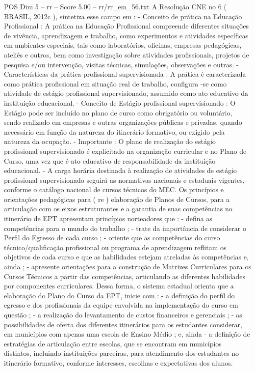 \begin{textsample}{POS Dim 5 – rr – Score 5.00 – rr/rr\_em\_56.txt}
A Resolução CNE no 6 ( BRASIL, 2012c ), sintetiza esse campo em : - Conceito de prática na Educação Profissional : A prática na Educação Profissional compreende diferentes situações de vivência, aprendizagem e trabalho, como experimentos e atividades específicas em ambientes especiais, tais como laboratórios, oficinas, empresas pedagógicas, ateliês e outros, bem como investigação sobre atividades profissionais, projetos de pesquisa e/ou intervenção, visitas técnicas, simulações, observações e outras. - Características da prática profissional supervisionada : A prática é caracterizada como prática profissional em situação real de trabalho, configura -se como atividade de estágio profissional supervisionado, assumido como ato educativo da instituição educacional. - Conceito de Estágio profissional supervisionado : O Estágio pode ser incluído no plano de curso como obrigatório ou voluntário, sendo realizado em empresas e outras organizações públicas e privadas, quando necessário em função da natureza do itinerário formativo, ou exigido pela natureza da ocupação. - Importante : O plano de realização do estágio profissional supervisionado é explicitado na organização curricular e no Plano de Curso, uma vez que é ato educativo de responsabilidade da instituição educacional. - A carga horária destinada à realização de atividades de estágio profissional supervisionado seguirá as normativas nacionais e estaduais vigentes, conforme o catálogo nacional de cursos técnicos do MEC.
Os princípios e orientações pedagógicas para ( re ) elaboração de Planos de Cursos, para a articulação com os eixos estruturantes e a garantia de suas competências no itinerário de EPT apresentam princípios norteadores que : - defina as competências para o mundo do trabalho ; - trate da importância de considerar o Perfil do Egresso de cada curso ; - oriente que as competências do curso técnico/qualificação profissional ou programa de aprendizagem reflitam os objetivos de cada curso e que as habilidades estejam atreladas às competências e, ainda ; - apresente orientações para a construção de Matrizes Curriculares para os Cursos Técnicos a partir das competências, articulando as diferentes habilidades por componentes curriculares.
Dessa forma, o sistema estadual orienta que a elaboração do Plano do Curso da EPT, inicie com : - a definição do perfil do egresso e dos profissionais da equipe envolvida na implementação do curso em questão ; - a realização do levantamento de custos financeiros e gerenciais ; - as possibilidades de oferta dos diferentes itinerários para os estudantes considerar, em municípios com apenas uma escola de Ensino Médio ; e, ainda - a definição de estratégias de articulação entre escolas, que se encontram em municípios distintos, incluindo instituições parceiras, para atendimento dos estudantes no itinerário formativo, conforme interesses, escolhas e expectativas dos alunos.

\end{textsample}
